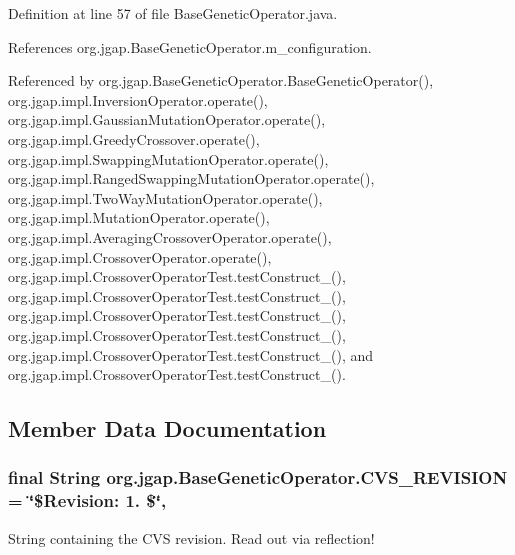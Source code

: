 Definition at line 57 of file Base\-Genetic\-Operator.\-java.



References org.\-jgap.\-Base\-Genetic\-Operator.\-m\-\_\-configuration.



Referenced by org.\-jgap.\-Base\-Genetic\-Operator.\-Base\-Genetic\-Operator(), org.\-jgap.\-impl.\-Inversion\-Operator.\-operate(), org.\-jgap.\-impl.\-Gaussian\-Mutation\-Operator.\-operate(), org.\-jgap.\-impl.\-Greedy\-Crossover.\-operate(), org.\-jgap.\-impl.\-Swapping\-Mutation\-Operator.\-operate(), org.\-jgap.\-impl.\-Ranged\-Swapping\-Mutation\-Operator.\-operate(), org.\-jgap.\-impl.\-Two\-Way\-Mutation\-Operator.\-operate(), org.\-jgap.\-impl.\-Mutation\-Operator.\-operate(), org.\-jgap.\-impl.\-Averaging\-Crossover\-Operator.\-operate(), org.\-jgap.\-impl.\-Crossover\-Operator.\-operate(), org.\-jgap.\-impl.\-Crossover\-Operator\-Test.\-test\-Construct\-\_(), org.\-jgap.\-impl.\-Crossover\-Operator\-Test.\-test\-Construct\-\_(), org.\-jgap.\-impl.\-Crossover\-Operator\-Test.\-test\-Construct\-\_(), org.\-jgap.\-impl.\-Crossover\-Operator\-Test.\-test\-Construct\-\_(), org.\-jgap.\-impl.\-Crossover\-Operator\-Test.\-test\-Construct\-\_(), and org.\-jgap.\-impl.\-Crossover\-Operator\-Test.\-test\-Construct\-\_().



\subsection{Member Data Documentation}
\hypertarget{classorg_1_1jgap_1_1_base_genetic_operator_aba554ef332d2c5e8ed792e26e466ae12}{
\subsubsection[{C\-V\-S\-\_\-\-R\-E\-V\-I\-S\-I\-O\-N}]{\setlength{\rightskip}{0pt plus 5cm}final String org.\-jgap.\-Base\-Genetic\-Operator.\-C\-V\-S\-\_\-\-R\-E\-V\-I\-S\-I\-O\-N = \char`\"{}\$Revision\-: 1. \$\char`\"{}\hspace{0.3cm}{\ttfamily [static]}, {\ttfamily [private]}}}\label{classorg_1_1jgap_1_1_base_genetic_operator_aba554ef332d2c5e8ed792e26e466ae12}
String containing the C\-V\-S revision. Read out via reflection! 

